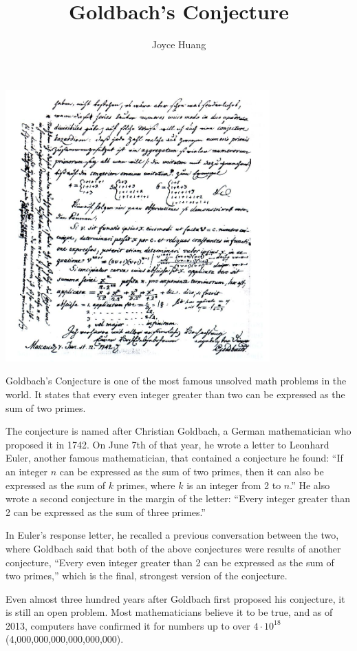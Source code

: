 \documentclass{article}
\title{Goldbach's Conjecture}
\author{Joyce Huang}
\begin{document}
\maketitle
\begin{center}
    \includegraphics[width=4in,scale=0.18]{images/goldbach-conjecture.jpg}
\end{center}

Goldbach’s Conjecture is one of the most famous unsolved math problems in the world. It states that every even integer greater than two can be expressed as the sum of two primes. 

The conjecture is named after Christian Goldbach, a German mathematician who proposed it in 1742. On June 7th of that year, he wrote a letter to Leonhard Euler, another famous mathematician, that contained a conjecture he found: ``If an integer $n$ can be expressed as the sum of two primes, then it can also be expressed as the sum of $k$ primes, where $k$ is an integer from 2 to $n$.'' He also wrote a second conjecture in the margin of the letter: ``Every integer greater than 2 can be expressed as the sum of three primes.'' 

In Euler’s response letter, he recalled a previous conversation between the two, where Goldbach said that both of the above conjectures were results of another conjecture, ``Every even integer greater than 2 can be expressed as the sum of two primes,'' which is the final, strongest version of the conjecture.  

Even almost three hundred years after Goldbach first proposed his conjecture, it is still an open problem. Most mathematicians believe it to be true, and as of 2013, computers have confirmed it for numbers up to over $4\cdot10^{18}$ (4,000,000,000,000,000,000). 
\end{document}
